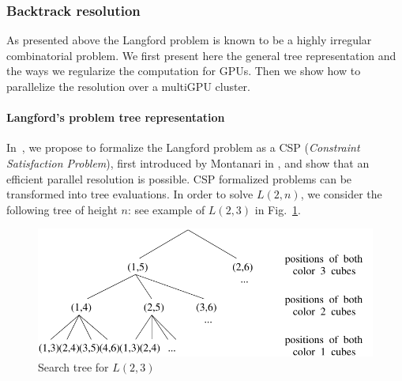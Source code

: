 %
%
%

\subsubsection{Backtrack resolution}

As presented above the Langford problem is known to be a highly irregular combinatorial problem. 
We first present here the general tree representation and the ways we regularize the computation for GPUs.
Then we show how to parallelize the resolution over a multiGPU cluster.

\paragraph{Langford's problem tree representation}
\label{sec:LGF_resolution}
In~\cite{HKS02}, we propose to formalize the Langford problem as a CSP  ({\it Constraint Satisfaction Problem}), first introduced by Montanari in \cite{Mon74}, and show that an efficient parallel resolution is possible. 
CSP formalized problems can be transformed into tree evaluations. %
In order to solve $L(2,n)$, we consider the following tree of height $n$: see example of $L(2,3)$ in Fig.~\ref{fig:arbre}.

\begin{figure}[htb]
\centering
\includegraphics[scale=.65]{figures/langford/arbre_en}
\caption{Search tree for $L(2,3)$}
\label{fig:arbre}
\end{figure}


